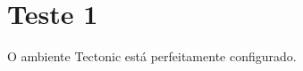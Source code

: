 \documentclass[12pt, openright, twoside, a4paper, english, brazil]{abntex2}
\begin{document}
\imprimircapa

\textual
\chapter{Teste 1}
O ambiente Tectonic está perfeitamente configurado. 
\end{document}
